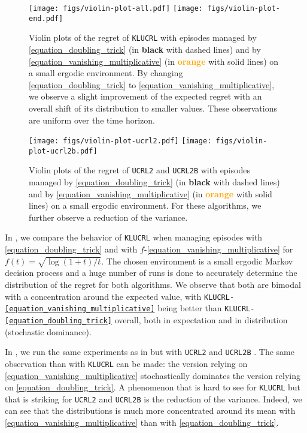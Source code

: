 \documentclass[preprint,cleveref,12pt]{colt2025}
\newcommand{\strong}[1]{\textbf{#1}}
\begin{document}
    \begin{figure}[ht]
        \texttt{[image: figs/violin-plot-all.pdf]}
        \hfill
        \texttt{[image: figs/violin-plot-end.pdf]}
        \caption{
        \label{figure_violin_klucrl}
            Violin plots of the regret of \texttt{KLUCRL} with episodes managed by \eqref{equation_doubling_trick} (in \strong{black} with dashed lines) and by \eqref{equation_vanishing_multiplicative} (in \textcolor{orange}{\strong{orange}} with solid lines) on a small ergodic environment. 
            By changing \eqref{equation_doubling_trick} to \eqref{equation_vanishing_multiplicative}, we observe a slight improvement of the expected regret with an overall shift of its distribution to smaller values.
            These observations are uniform over the time horizon.
        }
    \end{figure}

    \begin{figure}[ht]
        \centering
        \texttt{[image: figs/violin-plot-ucrl2.pdf]}
        \hfill
        \texttt{[image: figs/violin-plot-ucrl2b.pdf]}
        \caption{
        \label{figure_violin_others}
            Violin plots of the regret of \texttt{UCRL2} and \texttt{UCRL2B} with episodes managed by \eqref{equation_doubling_trick} (in \strong{black} with dashed lines) and by \eqref{equation_vanishing_multiplicative} (in \textcolor{orange}{\strong{orange}} with solid lines) on a small ergodic environment. 
            For these algorithms, we further observe a reduction of the variance.
        }
    \end{figure}

    In , we compare the behavior of \texttt{KLUCRL} when managing episodes with \eqref{equation_doubling_trick} and with $f$-\eqref{equation_vanishing_multiplicative} for $f(t) = \sqrt{\log(1+t)/t}$.
    The chosen environment is a small ergodic Markov decision process and a huge number of runs is done to accurately determine the distribution of the regret for both algorithms. 
    We observe that both are bimodal with a concentration around the expected value, with \texttt{KLUCRL-\eqref{equation_vanishing_multiplicative}} being better than \texttt{KLUCRL-\eqref{equation_doubling_trick}} overall, both in expectation and in distribution (stochastic dominance). 

    In , we run the same experiments as in  but with \texttt{UCRL2} \cite{auer_near_optimal_2009} and \texttt{UCRL2B} \cite{fruit_improved_2020}.
    The same observation than with \texttt{KLUCRL} can be made: the version relying on \eqref{equation_vanishing_multiplicative} stochastically dominates the version relying on \eqref{equation_doubling_trick}.
    A phenomenon that is hard to see for \texttt{KLUCRL} but that is striking for \texttt{UCRL2} and \texttt{UCRL2B} is the reduction of the variance.
    Indeed, we can see that the distributions is much more concentrated around its mean with \eqref{equation_vanishing_multiplicative} than with \eqref{equation_doubling_trick}.
\end{document}

